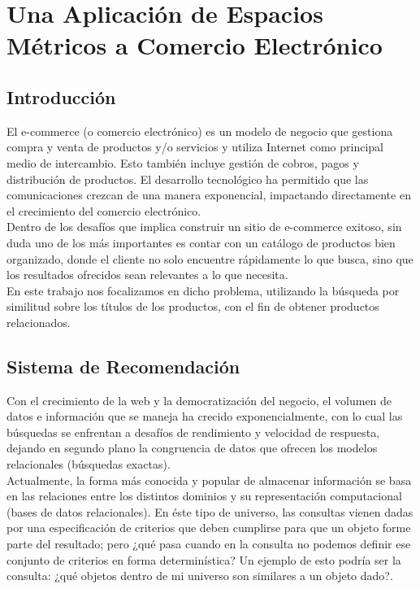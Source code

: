 \chapter{Una Aplicaci\'on de Espacios M\'etricos a Comercio Electr\'onico}

\section{Introducci\'on}

El e-commerce (o comercio electr\'onico) es un modelo de negocio que gestiona compra y venta de productos y/o servicios  y utiliza Internet como principal medio de intercambio. Esto tambi\'en incluye gesti\'on de cobros, pagos y distribuci\'on de productos. El desarrollo tecnol\'ogico ha permitido que las comunicaciones crezcan de una manera exponencial, impactando directamente en el crecimiento del comercio electr\'onico.\\

Dentro de los desaf\'ios que implica construir un sitio de e-commerce exitoso, sin duda uno de los m\'as importantes es contar con un cat\'alogo de productos bien organizado, donde el cliente no solo encuentre r\'apidamente lo que busca, sino que los resultados ofrecidos sean relevantes a lo que necesita.\\

En este trabajo nos focalizamos en dicho problema, utilizando la b\'usqueda por similitud sobre los t\'itulos de los productos, con el fin de obtener productos relacionados.

\section{Sistema de Recomendaci\'on}

Con el crecimiento de la web y la democratizaci\'on del negocio, el volumen de datos e informaci\'on que se maneja ha crecido exponencialmente, con lo cual las b\'usquedas se enfrentan a desaf\'ios de rendimiento y velocidad de respuesta, dejando en segundo plano la congruencia de datos que ofrecen los modelos relacionales (b\'usquedas exactas).\\

Actualmente, la forma m\'as conocida y popular de almacenar informaci\'on se basa en las relaciones entre los distintos dominios y su representaci\'on computacional (bases de datos relacionales). En \'este tipo de universo, las consultas vienen dadas por una especificaci\'on de criterios que deben cumplirse para que un objeto forme parte del resultado; pero ¿qu\'e pasa cuando en la consulta no podemos definir ese conjunto de criterios en forma determin\'istica? Un ejemplo de esto podr\'ia ser la consulta: ¿qu\'e objetos dentro de mi universo son similares a un objeto dado?.\\

